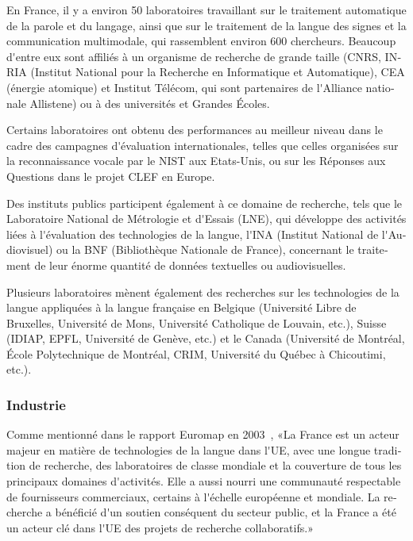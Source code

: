 \documentclass[]{../metanetpaper}
\begin{document}
\begin{french}
\begin{multicols}{2}
En France, il y a environ 50 laboratoires travaillant sur le traitement
automatique de la parole et du langage, ainsi que sur le traitement de
la langue des signes et la communication multimodale, qui
rassemblent environ 600 chercheurs. Beaucoup d{\mbox '}entre eux sont affiliés
à un organisme de recherche de grande taille (CNRS, INRIA (Institut
National pour la Recherche en Informatique et Automatique), CEA
(énergie atomique) et Institut Télécom, qui sont partenaires de
l{\mbox '}Alliance nationale Allistene) ou à des universités et Grandes Écoles.

Certains laboratoires ont obtenu des performances au meilleur niveau
dans le cadre des campagnes d{\mbox '}évaluation internationales, telles que
celles organisées sur la reconnaissance vocale par le NIST aux
Etats-Unis, ou sur les Réponses aux Questions dans le projet CLEF en
Europe.

Des instituts publics participent également à ce domaine de
recherche, tels que le Laboratoire National de Métrologie et d{\mbox '}Essais
(LNE), qui développe des activités liées à l{\mbox '}évaluation des
technologies de la langue, l{\mbox '}INA (Institut National de l{\mbox '}Audiovisuel)
ou la BNF (Bibliothèque Nationale de France), concernant le traitement
de leur énorme quantité de données textuelles ou audiovisuelles.

Plusieurs laboratoires mènent également des recherches sur les
technologies de la langue appliquées à la langue française en Belgique
(Université Libre de Bruxelles, Université de Mons, Université
Catholique de Louvain, etc.), Suisse (IDIAP, EPFL, Université de
Genève, etc.) et le Canada (Université de Montréal, École
Polytechnique de Montréal, CRIM, Université du Québec à Chicoutimi,
etc.).

\subsubsection{Industrie}

Comme mentionné dans le rapport Euromap en 2003~\cite{euromap}, «La
France est un acteur majeur en matière de technologies de la langue
dans l{\mbox '}UE, avec une longue tradition de recherche, des laboratoires de
classe mondiale et la couverture de tous les principaux domaines
d{\mbox '}activités. Elle a aussi nourri une communauté respectable de
fournisseurs commerciaux, certains à l{\mbox '}échelle européenne et
mondiale. La recherche a bénéficié d{\mbox '}un soutien conséquent du secteur
public, et la France a été un acteur clé dans l{\mbox '}UE des projets de
recherche collaboratifs.»


\end{multicols}
\end{french}
\end{document}
